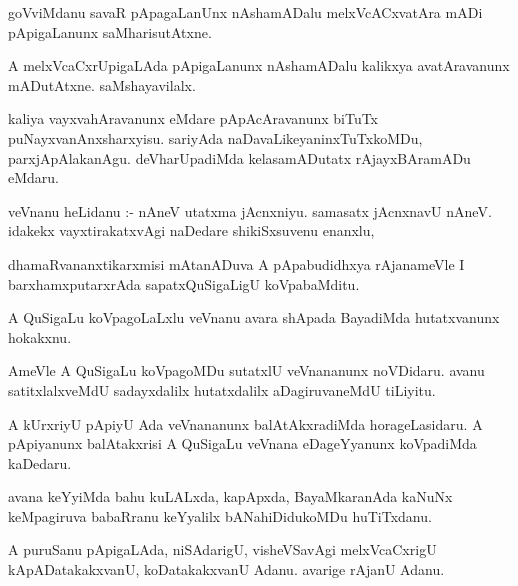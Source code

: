 \documentclass{article}
\begin{document}
\begin{mn}
goVviMdanu savaR pApagaLanUnx  nAshamADalu melxVcACxvatAra mADi pApigaLanunx saMharisutAtxne.
\end{mn}

\begin{mn}
A melxVcaCxrUpigaLAda pApigaLanunx nAshamADalu kalikxya avatAravanunx mADutAtxne.  saMshayavilalx.
\end{mn}

\begin{mn}
kaliya vayxvahAravanunx  eMdare pApAcAravanunx biTuTx puNayxvanAnxsharxyisu.  sariyAda  
naDavaLikeyaninxTuTxkoMDu,  parxjApAlakanAgu. deVharUpadiMda kelasamADutatx rAjayxBAramADu eMdaru.
\end{mn}

\begin{mn}
veVnanu heLidanu :-  nAneV utatxma jAcnxniyu.  samasatx jAcnxnavU nAneV.  
idakekx vayxtirakatxvAgi naDedare shikiSxsuvenu enanxlu,
\end{mn}

\begin{mn}
dhamaRvananxtikarxmisi mAtanADuva A pApabudidhxya rAjanameVle I barxhamxputarxrAda sapatxQuSigaLigU koVpabaMditu.
\end{mn}

\begin{mn}
A QuSigaLu koVpagoLaLxlu veVnanu avara shApada BayadiMda hutatxvanunx hokakxnu.
\end{mn}

\begin{mn}
AmeVle A QuSigaLu koVpagoMDu sutatxlU veVnananunx noVDidaru.  avanu satitxlalxveMdU  
sadayxdalilx hutatxdalilx aDagiruvaneMdU tiLiyitu.
\end{mn}

\begin{mn}
A kUrxriyU pApiyU Ada veVnananunx balAtAkxradiMda horageLasidaru.  A pApiyanunx  
balAtakxrisi A QuSigaLu veVnana eDageYyanunx koVpadiMda kaDedaru.
\end{mn}

\begin{mn}
avana keYyiMda bahu kuLALxda, kapApxda, BayaMkaranAda kaNuNx keMpagiruva 
babaRranu keYyalilx bANahiDidukoMDu huTiTxdanu.
\end{mn}

\begin{mn}
A puruSanu pApigaLAda, niSAdarigU,  visheVSavAgi melxVcaCxrigU kApADatakakxvanU, 
koDatakakxvanU Adanu.  avarige rAjanU Adanu. 
\end{mn}
\end{document}
